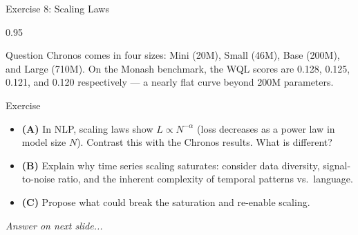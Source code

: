 \documentclass[9pt, aspectratio=169, t]{beamer}
\begin{document}
\begin{frame}{Exercise 8: Scaling Laws}
    \begin{cminipage}{0.95\textwidth}
    \begin{alertblock}{Question}
        Chronos comes in four sizes: Mini (20M), Small (46M), Base (200M), and Large (710M). On the Monash benchmark, the WQL scores are 0.128, 0.125, 0.121, and 0.120 respectively --- a nearly flat curve beyond 200M parameters.
    \end{alertblock}

    \vspace{0.2cm}

    \begin{block}{Exercise}
        \begin{itemize}\setlength{\itemsep}{3pt}
            \item \textcolor{MainBlue}{\textbf{(A)}} In NLP, scaling laws show $L \propto N^{-\alpha}$ (loss decreases as a power law in model size $N$). Contrast this with the Chronos results. What is different?
            \item \textcolor{MainBlue}{\textbf{(B)}} Explain why time series scaling saturates: consider data diversity, signal-to-noise ratio, and the inherent complexity of temporal patterns vs.\ language.
            \item \textcolor{MainBlue}{\textbf{(C)}} Propose what could break the saturation and re-enable scaling.
        \end{itemize}
    \end{block}

    \vspace{0.2cm}

    \begin{center}
        \textit{Answer on next slide...}
    \end{center}
    \end{cminipage}
\end{frame}
\end{document}
